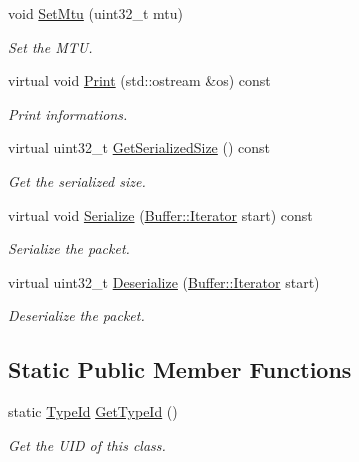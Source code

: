 \begin{DoxyCompactItemize}
void \hyperlink{classns3_1_1Icmpv6OptionMtu_a61b6be4bcae0751d720694825c7cdade}{Set\+Mtu} (uint32\+\_\+t mtu)
\begin{DoxyCompactList}\small\item\em Set the M\+TU. \end{DoxyCompactList}\item 
virtual void \hyperlink{classns3_1_1Icmpv6OptionMtu_a0992d3c4ce0eea3421ae95d9942af577}{Print} (std\+::ostream \&os) const 
\begin{DoxyCompactList}\small\item\em Print informations. \end{DoxyCompactList}\item 
virtual uint32\+\_\+t \hyperlink{classns3_1_1Icmpv6OptionMtu_a3665a1fa24609e2ab49fe411cd478a34}{Get\+Serialized\+Size} () const 
\begin{DoxyCompactList}\small\item\em Get the serialized size. \end{DoxyCompactList}\item 
virtual void \hyperlink{classns3_1_1Icmpv6OptionMtu_a7fb0a0d983fc4ca0d906da376bd9bceb}{Serialize} (\hyperlink{classns3_1_1Buffer_1_1Iterator}{Buffer\+::\+Iterator} start) const 
\begin{DoxyCompactList}\small\item\em Serialize the packet. \end{DoxyCompactList}\item 
virtual uint32\+\_\+t \hyperlink{classns3_1_1Icmpv6OptionMtu_a047fb91d197554eeb1d3e56f8eb96912}{Deserialize} (\hyperlink{classns3_1_1Buffer_1_1Iterator}{Buffer\+::\+Iterator} start)
\begin{DoxyCompactList}\small\item\em Deserialize the packet. \end{DoxyCompactList}\end{DoxyCompactItemize}
\subsection*{Static Public Member Functions}
\begin{DoxyCompactItemize}
\item 
static \hyperlink{classns3_1_1TypeId}{Type\+Id} \hyperlink{classns3_1_1Icmpv6OptionMtu_a45758c16d25c0894920de8719ccbb1e6}{Get\+Type\+Id} ()
\begin{DoxyCompactList}\small\item\em Get the U\+ID of this class. \end{DoxyCompactList}\end{DoxyCompactItemize}
